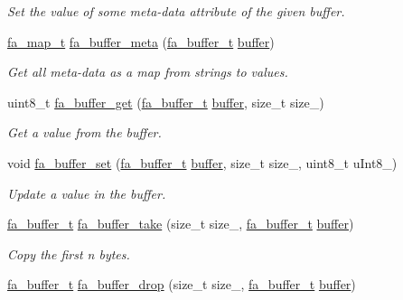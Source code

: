 \begin{DoxyCompactItemize}
\begin{DoxyCompactList}\small\item\em Set the value of some meta-\/data attribute of the given buffer. \end{DoxyCompactList}\item 
\hyperlink{group___fa_map_gadcbb0c425af31be6aeb265159b2a7db0}{fa\-\_\-map\-\_\-t} \hyperlink{group___fa_buffer_ga8cae6305af4695da927f707f00e530bd}{fa\-\_\-buffer\-\_\-meta} (\hyperlink{group___fa_buffer_ga0ed7a1d783ab322e2e8be02432d0839e}{fa\-\_\-buffer\-\_\-t} \hyperlink{util_8h_ad0c623e8b04565926f5b48888327724a}{buffer})
\begin{DoxyCompactList}\small\item\em Get all meta-\/data as a map from strings to values. \end{DoxyCompactList}\item 
uint8\-\_\-t \hyperlink{group___fa_buffer_ga6a4d986aa6ce7023563bc9f3e3dd416f}{fa\-\_\-buffer\-\_\-get} (\hyperlink{group___fa_buffer_ga0ed7a1d783ab322e2e8be02432d0839e}{fa\-\_\-buffer\-\_\-t} \hyperlink{util_8h_ad0c623e8b04565926f5b48888327724a}{buffer}, size\-\_\-t size\-\_\-)
\begin{DoxyCompactList}\small\item\em Get a value from the buffer. \end{DoxyCompactList}\item 
void \hyperlink{group___fa_buffer_ga2ba7ad9f2ad61d4d908eedb862c99474}{fa\-\_\-buffer\-\_\-set} (\hyperlink{group___fa_buffer_ga0ed7a1d783ab322e2e8be02432d0839e}{fa\-\_\-buffer\-\_\-t} \hyperlink{util_8h_ad0c623e8b04565926f5b48888327724a}{buffer}, size\-\_\-t size\-\_\-, uint8\-\_\-t u\-Int8\-\_\-)
\begin{DoxyCompactList}\small\item\em Update a value in the buffer. \end{DoxyCompactList}\item 
\hyperlink{group___fa_buffer_ga0ed7a1d783ab322e2e8be02432d0839e}{fa\-\_\-buffer\-\_\-t} \hyperlink{group___fa_buffer_ga3aa381eabd42a82492cec36b0f2dced4}{fa\-\_\-buffer\-\_\-take} (size\-\_\-t size\-\_\-, \hyperlink{group___fa_buffer_ga0ed7a1d783ab322e2e8be02432d0839e}{fa\-\_\-buffer\-\_\-t} \hyperlink{util_8h_ad0c623e8b04565926f5b48888327724a}{buffer})
\begin{DoxyCompactList}\small\item\em Copy the first n bytes. \end{DoxyCompactList}\item 
\hyperlink{group___fa_buffer_ga0ed7a1d783ab322e2e8be02432d0839e}{fa\-\_\-buffer\-\_\-t} \hyperlink{group___fa_buffer_ga0d057fff991ddc68b23635c3bef09111}{fa\-\_\-buffer\-\_\-drop} (size\-\_\-t size\-\_\-, \hyperlink{group___fa_buffer_ga0ed7a1d783ab322e2e8be02432d0839e}{fa\-\_\-buffer\-\_\-t} \hyperlink{util_8h_ad0c623e8b04565926f5b48888327724a}{buffer})

\end{DoxyCompactItemize}
